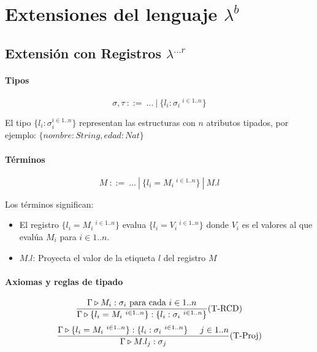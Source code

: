 \section{Extensiones del lenguaje \texorpdfstring{$\lambda^b$}{lambda b}}



\subsection{Extensión con Registros \texorpdfstring{$\lambda^{...r}$}{lambda ...r+}}

\paragraph{Tipos}
$$\sigma, \tau ~::=~...~|~\{l_i : \sigma_i ~^{i\in 1..n}\}$$

El tipo $\{l_i : \sigma_i^{i\in 1..n}\}$ representan las estructuras con $n$ atributos tipados, por ejemplo: $\{nombre : String,edad:Nat\}$
\paragraph{Términos}
$$ M~::=~ \dots~|~\{l_i = M_i ~^{i\in 1..n}\}~|~M.l $$

Los términos significan:
\begin{itemize}
    \item El registro $\{l_i = M_i ~^{i\in 1..n}\}$ evalua $\{l_i = V_i ~^{i\in 1..n}\}$  donde $V_i$ es el valores al que evalúa $M_i$ para $i\in 1..n$.
    \item $M.l$: Proyecta el valor de la etiqueta $l$ del registro $M$
\end{itemize}

\paragraph{Axiomas y reglas de tipado}
\begin{equation*}
\frac{\Gamma\triangleright M_i : \sigma_i \text{ para cada } i \in 1..n}{\Gamma\triangleright \{l_i = M_i ~^{i\in 1..n}\} : \{l_i : \sigma_i ~^{i\in 1..n}\}}(\text{T-RCD})
\end{equation*}
\vspace*{5mm}
\begin{equation*}
\frac{\Gamma\triangleright \{l_i = M_i ~^{i\in 1..n}\} : \{l_i : \sigma_i ~^{i\in 1..n}\}\hspace*{5mm} j \in 1..n}
{\Gamma\triangleright M.l_j : \sigma_j}(\text{T-Proj})
\end{equation*}

